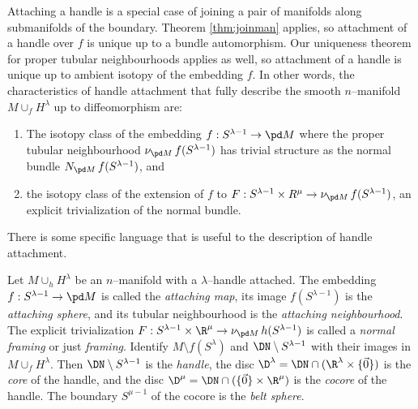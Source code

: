 Attaching a handle is a special case of joining a pair of manifolds along submanifolds of the boundary.
Theorem \ref{thm:joinman} applies, so attachment of a handle over $f$ is unique up to a bundle automorphism.
Our uniqueness theorem for proper tubular neighbourhoods applies as well, so attachment of a handle is unique up to ambient isotopy of the embedding $f$.
In other words, the characteristics of handle attachment that fully describe the smooth $n$--manifold $M\cup_f H^\lambda$ up to diffeomorphism are:
\begin{enumerate}
	\item The isotopy class of the embedding $f:S^{\lambda-1}\to\pd M$ where the proper tubular neighbourhood $\nu_{\pd M}\,f(S^{\lambda-1})$ has trivial structure as the normal bundle $N_{\pd M}\,f(S^{\lambda-1})$, and 
	\item the isotopy class of the extension of $f$ to $F: S^{\lambda-1}\times R^\mu\to \nu_{\pd M}\,f(S^{\lambda-1})$, an explicit trivialization of the normal bundle.
\end{enumerate}

There is some specific language that is useful to the description of handle attachment.

\begin{defn}
	Let $M\cup_h H^\lambda$ be an $n$--manifold with a $\lambda$--handle attached.
	The embedding $f:S^{\lambda-1}\to\pd M$ is called the \emph{attaching map}, its image $f(S^{\lambda-1})$ is the \emph{attaching sphere}, and its tubular neighbourhood is the \emph{attaching neighbourhood}.
	The explicit trivialization $F: S^{\lambda-1}\times \R^\mu\to \nu_{\pd M}\,h(S^{\lambda-1})$ is called a \emph{normal framing} or just \emph{framing}.
	Identify $M\setminus f(S^{\lambda})$ and $\DN\setminus S^{\lambda-1}$ with their images in $M\cup_f H^\lambda$.
	Then $\DN\setminus S^{\lambda-1}$ is the \emph{handle}, the disc $\D^\lambda=\DN\cap(\R^\lambda\times\{\vec{0}\})$ is the \emph{core} of the handle, and the disc $\D^\mu=\DN\cap(\{\vec{0}\}\times\R^\mu)$ is the \emph{cocore} of the handle.
	The boundary $S^{\mu-1}$ of the cocore is the \emph{belt sphere}.
\end{defn}

